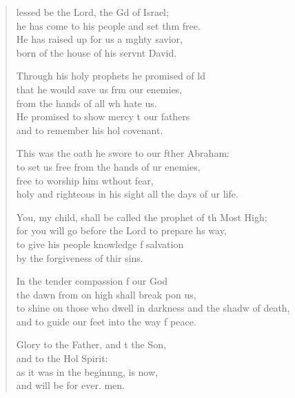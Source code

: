 \begin{verse}
  \begin{patverse}
lessed be the Lord, the Gd of Israel;\Med\\
he has come to his people and set thm free.\\
He has raised up for us a m\pointup{\i}ghty savior,\Med\\
born of the house of his servnt David.

Through his holy prophets he promised of ld\Flex\\
that he would save us frm our enemies,\Med\\
from the hands of all wh hate us.\\
He promised to show mercy t our fathers\Med\\
and to remember his hol covenant.

This was the oath he swore to our fther Abraham:\Med\\
to set us free from the hands of ur enemies,\\
free to worship him w\pointup{\i}thout fear,\Med\\
holy and righteous in his sight all the days of ur life.

You, my child, shall be called the prophet of th Most High;\Med\\
for you will go before the Lord to prepare h\pointup{\i}s way,\\
to give his people knowledge f salvation\Med\\
by the forgiveness of thir sins.

In the tender compassion f our God\Med\\
the dawn from on high shall break pon us,\\
to shine on those who dwell in darkness and the shadw of death,\Med\\
and to guide our feet into the way f peace.

Glory to the Father, and t the Son,\Med\\
and to the Hol Spirit:\\
as it was in the beginn\pointup{\i}ng, is now,\Med\\
and will be for ever. men.
  \end{patverse}
  \end{verse}
